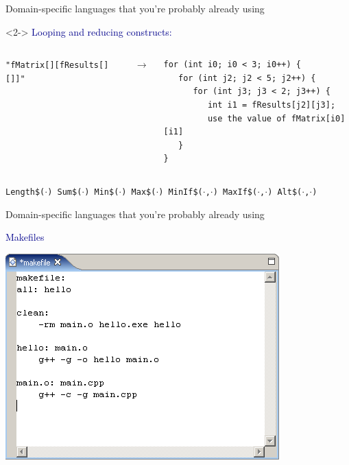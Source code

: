 \documentclass[aspectratio=169]{beamer}
\begin{document}
\begin{frame}[fragile]{Domain-specific languages that you're probably already using}
\vspace{-0.5 cm}
\begin{uncoverenv}<2->
\textcolor{darkblue}{\large Looping and reducing constructs:}

\vspace{0.25 cm}
\begin{columns}
\texttt{"fMatrix[][fResults[][]]"}

\mbox{\hspace{0.5 cm}$\longrightarrow$}

\scriptsize
\begin{verbatim}
for (int i0; i0 < 3; i0++) {
   for (int j2; j2 < 5; j2++) {
      for (int j3; j3 < 2; j3++) {
         int i1 = fResults[j2][j3];
         use the value of fMatrix[i0][i1]
   }
}
\end{verbatim}
\end{columns}

\vspace{0.5 cm}
\mbox{\tt\small Length\$($\cdot$) Sum\$($\cdot$) Min\$($\cdot$) Max\$($\cdot$) MinIf\$($\cdot$,$\cdot$) MaxIf\$($\cdot$,$\cdot$) Alt\$($\cdot$,$\cdot$)\hspace{1 cm}}
\end{uncoverenv}
\end{frame}

\begin{frame}{Domain-specific languages that you're probably already using}
\LARGE
\vspace{0.25 cm}

\textcolor{darkblue}{Makefiles}

\vspace{0.25 cm}
\begin{center}
\includegraphics[width=0.5\linewidth]{makefile.png}
\end{center}
\end{frame}
\end{document}
